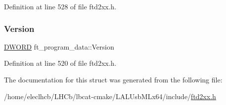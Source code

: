 Definition at line 528 of file ftd2xx.\+h.

\mbox{\label{structft__program__data_a9ef2eb59fe9ef1699df92a9d50ac3a81}} 
\subsubsection{\texorpdfstring{Version}{Version}}
{\footnotesize\ttfamily \hyperlink{CatCaloProto40MHz_2inc_2WinTypes_8h_ad342ac907eb044443153a22f964bf0af}{D\+W\+O\+RD} ft\+\_\+program\+\_\+data\+::\+Version}



Definition at line 520 of file ftd2xx.\+h.



The documentation for this struct was generated from the following file\+:\begin{DoxyCompactItemize}
\item 
/home/eleclhcb/\+L\+H\+Cb/lbcat-\/cmake/\+L\+A\+L\+Usb\+M\+Lx64/include/\hyperlink{LALUsbMLx64_2include_2ftd2xx_8h}{ftd2xx.\+h}\end{DoxyCompactItemize}
